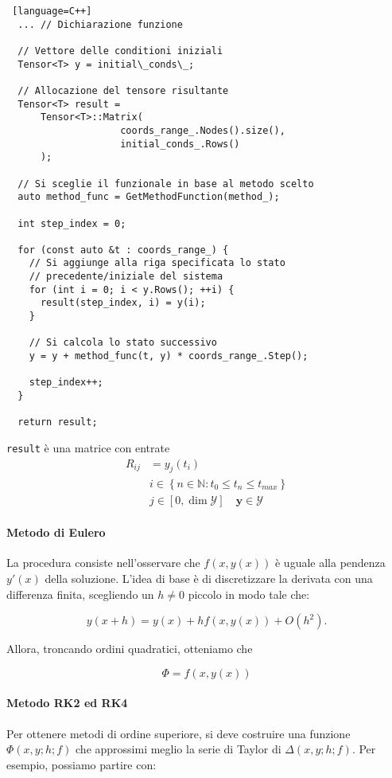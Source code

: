 \begin{lstlisting} [language=C++] 
  ... // Dichiarazione funzione 

  // Vettore delle conditioni iniziali
  Tensor<T> y = initial\_conds\_;

  // Allocazione del tensore risultante
  Tensor<T> result =
      Tensor<T>::Matrix(
                    coords_range_.Nodes().size(),
                    initial_conds_.Rows()
      );

  // Si sceglie il funzionale in base al metodo scelto
  auto method_func = GetMethodFunction(method_);

  int step_index = 0;

  for (const auto &t : coords_range_) {
    // Si aggiunge alla riga specificata lo stato
    // precedente/iniziale del sistema
    for (int i = 0; i < y.Rows(); ++i) {
      result(step_index, i) = y(i);
    }

    // Si calcola lo stato successivo 
    y = y + method_func(t, y) * coords_range_.Step();

    step_index++;
  }

  return result;
\end{lstlisting}

\texttt{result} è una matrice con entrate
\begin{align*}
	R_{ij} & = y_j(t_i)                                                        \\
	       & i \in \left\{n \in \mathbb{N} : t_0 \leq t_n \leq t_{max}\right\} \\
	       & j \in [0, \dim{\mathcal{Y}}] \quad \mathbf{y} \in \mathcal{Y}
\end{align*}


\paragraph{Metodo di Eulero}
La procedura consiste nell'osservare che \(f(x, y(x))\) è uguale alla pendenza
\(y'(x)\) della soluzione. L'idea di base è di discretizzare la derivata con una
differenza finita, scegliendo un \(h \neq 0\) piccolo in modo tale che:

\[
	y(x + h) = y(x) + h f(x, y(x)) + O(h^2).
\]

Allora, troncando ordini quadratici, otteniamo che

\[
	\Phi = f(x, y(x))
\]

\paragraph{Metodo RK2 ed RK4}
Per ottenere metodi di ordine superiore, si deve costruire una funzione \(\Phi(x, y; h; f)\) che approssimi meglio la serie di Taylor di \(\Delta(x, y; h; f)\). Per esempio, possiamo partire con:

